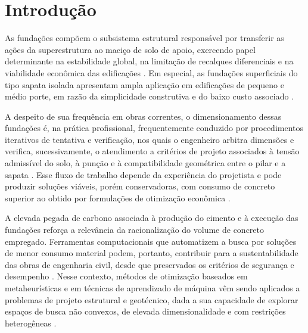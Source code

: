 \section{Introdução}
\label{sec:introducao}

As fundações compõem o subsistema estrutural responsável por transferir as ações da superestrutura ao maciço de solo de apoio, exercendo papel determinante na estabilidade global, na limitação de recalques diferenciais e na viabilidade econômica das edificações . Em especial, as fundações superficiais do tipo sapata isolada apresentam ampla aplicação em edificações de pequeno e médio porte, em razão da simplicidade construtiva e do baixo custo associado .

A despeito de sua frequência em obras correntes, o dimensionamento dessas fundações é, na prática profissional, frequentemente conduzido por procedimentos iterativos de tentativa e verificação, nos quais o engenheiro arbitra dimensões e verifica, sucessivamente, o atendimento a critérios de projeto associados à tensão admissível do solo, à punção e à compatibilidade geométrica entre o pilar e a sapata . Esse fluxo de trabalho depende da experiência do projetista e pode produzir soluções viáveis, porém conservadoras, com consumo de concreto superior ao obtido por formulações de otimização econômica .

A elevada pegada de carbono associada à produção do cimento e à execução das fundações reforça a relevância da racionalização do volume de concreto empregado. Ferramentas computacionais que automatizem a busca por soluções de menor consumo material podem, portanto, contribuir para a sustentabilidade das obras de engenharia civil, desde que preservados os critérios de segurança e desempenho . Nesse contexto, métodos de otimização baseados em metaheurísticas e em técnicas de aprendizado de máquina vêm sendo aplicados a problemas de projeto estrutural e geotécnico, dada a sua capacidade de explorar espaços de busca não convexos, de elevada dimensionalidade e com restrições heterogêneas .

